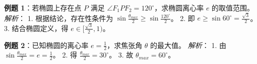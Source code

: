 \begin{examplebox}
\textbf{例题 1}：若椭圆上存在点 $P$ 满足 $\angle F_1PF_2 = 120^\circ$，求椭圆离心率 $e$ 的取值范围。
\textit{解析}：
1. 根据结论，存在性条件为 $\sin \frac{\theta_{max}}{2} \ge \sin \frac{120^\circ}{2}$。
2. 即 $e \ge \sin 60^\circ = \frac{\sqrt{3}}{2}$。
3. 结合椭圆定义，得 $e \in [\frac{\sqrt{3}}{2}, 1)$。

\textbf{例题 2}：已知椭圆的离心率 $e = \frac{1}{2}$，求焦张角 $\theta$ 的最大值。
\textit{解析}：
1. 由 $\sin \frac{\theta_{max}}{2} = e = \frac{1}{2}$。
2. 得 $\frac{\theta_{max}}{2} = 30^\circ$。
3. 故 $\theta_{max} = 60^\circ$。
\end{examplebox}